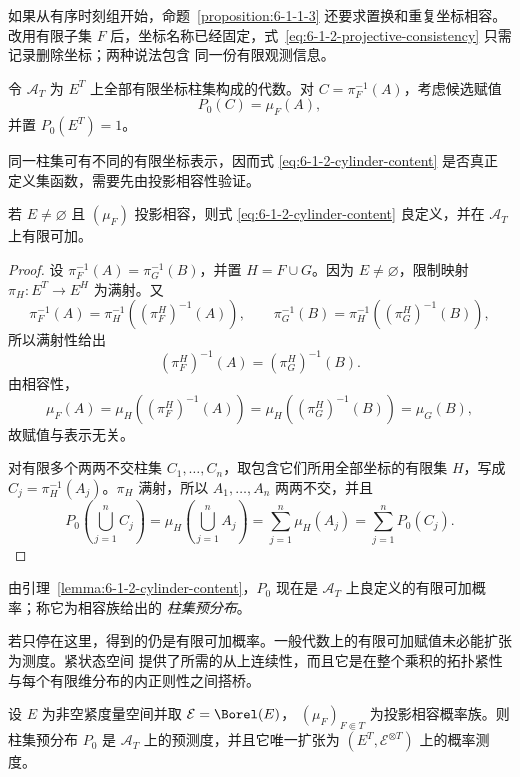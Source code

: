 如果从有序时刻组开始，命题~\ref{proposition:6-1-1-3} 还要求置换和重复坐标相容。改用有限子集
$F$ 后，坐标名称已经固定，式~\eqref{eq:6-1-2-projective-consistency} 只需记录删除坐标；两种说法包含
同一份有限观测信息。

\begin{definition}[柱集候选赋值]\label{def:6-1-2-2}
令 $\mathcal A_T$ 为 $E^T$ 上全部有限坐标柱集构成的代数。对
$C=\pi_F^{-1}(A)$，考虑候选赋值
\[
  P_0(C)=\mu_F(A),
  \tag{6.1.3}\label{eq:6-1-2-cylinder-content}
\]
并置 $P_0(E^T)=1$。
\end{definition}

同一柱集可有不同的有限坐标表示，因而式
\eqref{eq:6-1-2-cylinder-content} 是否真正定义集函数，需要先由投影相容性验证。

\begin{lemma}[柱集赋值的良定义与有限可加性]\label{lemma:6-1-2-cylinder-content}
若 $E\ne\varnothing$ 且 $(\mu_F)$ 投影相容，则式
\eqref{eq:6-1-2-cylinder-content} 良定义，并在 $\mathcal A_T$ 上有限可加。
\end{lemma}

\begin{proof}
设
$\pi_F^{-1}(A)=\pi_G^{-1}(B)$，并置 $H=F\cup G$。因为 $E\ne\varnothing$，限制映射
$\pi_H:E^T\to E^H$ 为满射。又
\[
 \pi_F^{-1}(A)=\pi_H^{-1}((\pi_F^H)^{-1}(A)),\qquad
 \pi_G^{-1}(B)=\pi_H^{-1}((\pi_G^H)^{-1}(B)),
\]
所以满射性给出
\[
  (\pi_F^H)^{-1}(A)=(\pi_G^H)^{-1}(B).
\]
由相容性，
\[
 \mu_F(A)
 =\mu_H((\pi_F^H)^{-1}(A))
 =\mu_H((\pi_G^H)^{-1}(B))
 =\mu_G(B),
\]
故赋值与表示无关。

对有限多个两两不交柱集 $C_1,\ldots,C_n$，取包含它们所用全部坐标的有限集 $H$，写成
$C_j=\pi_H^{-1}(A_j)$。$\pi_H$ 满射，所以 $A_1,\ldots,A_n$ 两两不交，并且
\[
 P_0\!\left(\bigcup_{j=1}^nC_j\right)
 =\mu_H\!\left(\bigcup_{j=1}^nA_j\right)
 =\sum_{j=1}^n\mu_H(A_j)
 =\sum_{j=1}^nP_0(C_j).
\]
\end{proof}

由引理~\ref{lemma:6-1-2-cylinder-content}，$P_0$ 现在是 $\mathcal A_T$ 上良定义的有限可加概率；称它为相容族给出的
\emph{柱集预分布}。

若只停在这里，得到的仍是有限可加概率。一般代数上的有限可加赋值未必能扩张为测度。紧状态空间
提供了所需的从上连续性，而且它是在整个乘积的拓扑紧性与每个有限维分布的内正则性之间搭桥。

\begin{lemma}[紧状态空间上的柱预测度]\label{lemma:6-1-2-2}
设 $E$ 为非空紧度量空间并取 $\mathcal E=\Borel(E)$，
$(\mu_F)_{F\Subset T}$ 为投影相容概率族。则柱集预分布
$P_0$ 是 $\mathcal A_T$ 上的预测度，并且它唯一扩张为
$(E^T,\mathcal E^{\otimes T})$ 上的概率测度。
\end{lemma}

